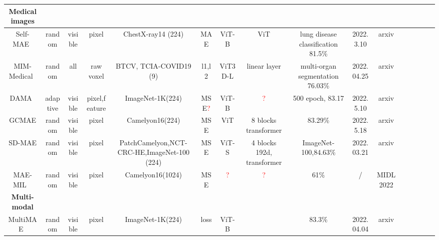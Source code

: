 \documentclass[10pt,journal,compsoc]{IEEEtran}
\begin{document}
\begin{table}[htb]
{\begin{tabular}{cccccccccccccccc}
\hline 
\textbf{Medical images} \\
\hline 
Self-MAE~\cite{zhou2022self} & random & visible & pixel  & ChestX-ray14 (224)  & MAE &  ViT-B &  ViT&  lung disease classification 81.5\% &2022.3.10 & arxiv  \\
\hline 
MIM-Medical~\cite{chen2022masked}   &random   & all  &  raw voxel &  BTCV, TCIA-COVID19 (9)  & l1,l2  & ViT3D-L & linear layer     &  multi-organ segmentation 76.03\%   & 2022.04.25 & arxiv\\
\hline 
DAMA~\cite{ly2022student}   & adaptive  &visible  &  pixel,feature &  ImageNet-1K(224)  & MSE\textcolor{red}{?}  & ViT-B & \textcolor{red}{?}     &  500 epoch, 83.17 & 2022.5.10 & arxiv \\
\hline 
GCMAE ~\cite{quan2022global}   &random  &visible  &  pixel &  Camelyon16(224)  & MSE  & ViT & 8 blocks transformer     &  83.29\%  & 2022.5.18 & arxiv\\
\hline 
SD-MAE ~\cite{luo2022self}   &random  & visible  &  pixel &  PatchCamelyon,NCT-CRC-HE,ImageNet-100 (224)& MSE  & ViT-S & 4  blocks  192d, transformer   &  ImageNet-100,84.63\% & 2022.03.21 & arxiv\\
\hline 
MAE-MIL ~\cite{an2022masked}   &random   &visible  &  pixel &  Camelyon16(1024)  & MSE  & \textcolor{red}{?} & \textcolor{red}{?}     &  61\% & / & MIDL 2022\\
\hline 
\textbf{Multi-modal}  \\
\hline 
MultiMAE~\cite{bachmann2022multimae}   &random  &visible  &  pixel &   ImageNet-1K(224)  & loss  & ViT-B &      &  83.3\% &2022.04.04 & arxiv\\
\hline 
\end{tabular}}
\end{table}
\end{document}
